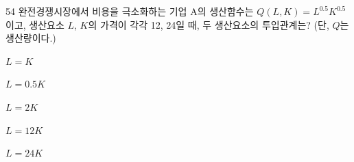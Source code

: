\begin{question}{54}
완전경쟁시장에서 비용을 극소화하는 기업 A의 생산함수는 $Q(L,K)=L^{0.5}K^{0.5}$ 이고, 생산요소 $L$, $K$의 가격이 각각 12, 24일 때, 두 생산요소의 투입관계는? (단, $Q$는 생산량이다.)
\begin{choices}
  \item $L=K$
  \item $L=0.5K$
  \item $L=2K$
  \item $L=12K$
  \item $L=24K$
\end{choices}
\end{question}
